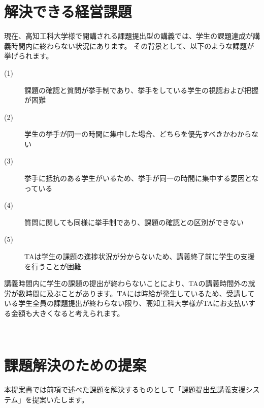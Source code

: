 \documentclass[a4j,titlepage]{ujarticle}
\begin{document}
\section{解決できる経営課題}
現在、高知工科大学様で開講される課題提出型の講義では、学生の課題達成が講義時間内に終わらない状況にあります。
その背景として、以下のような課題が挙げられます。
\begin{description}
\item[(1)]課題の確認と質問が挙手制であり、挙手をしている学生の視認および把握が困難
\item[(2)]学生の挙手が同一の時間に集中した場合、どちらを優先すべきかわからない
\item[(3)]挙手に抵抗のある学生がいるため、挙手が同一の時間に集中する要因となっている
\item[(4)]質問に関しても同様に挙手制であり、課題の確認との区別ができない
\item[(5)]TAは学生の課題の進捗状況が分からないため、講義終了前に学生の支援を行うことが困難
\end{description}
講義時間内に学生の課題の提出が終わらないことにより、TAの講義時間外の就労が数時間に及ぶことがあります。TAには時給が発生しているため、受講している学生全員の課題提出が終わらない限り、高知工科大学様がTAにお支払いする金額も大きくなると考えられます。


\section{課題解決のための提案}
本提案書では前項で述べた課題を解決するものとして「課題提出型講義支援システム」を提案いたします。
\end{document}
